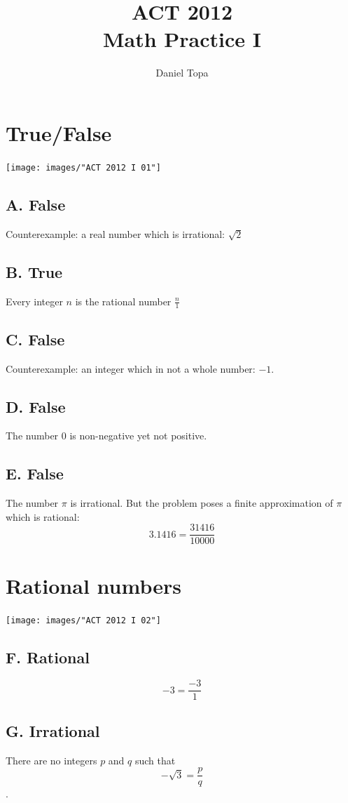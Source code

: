 \documentclass[11pt, oneside]{article}
\title{ACT 2012\\Math Practice I}
\author{Daniel Topa}
\begin{document}
\maketitle

\section{True/False}
\texttt{[image: images/"ACT 2012 I 01"]}
\subsection{A. False}
Counterexample: a real number which is irrational: $\sqrt{2}$
\subsection{B. True}
Every integer $n$ is the rational number $\frac{n}{1}$
\subsection{C. False}
Counterexample: an integer which in not a whole number: $-1$.
\subsection{D. False}
The number $0$ is non-negative yet not positive.
\subsection{E. False}
The number $\pi$ is irrational. But the problem poses a finite approximation of $\pi$ which is rational: 
$$3.1416=\frac{31416}{10000}$$

\section{Rational numbers}
\texttt{[image: images/"ACT 2012 I 02"]}
\subsection{F. Rational}
$$-3 = \frac{-3}{1}$$
\subsection{G. Irrational}
There are no integers $p$ and $q$ such that $$-\sqrt{3} = \frac{p}{q}$$.
\end{document}
